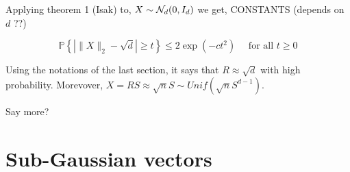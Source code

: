 \documentclass{article}
\begin{document}
Applying theorem 1 (Isak) to, $X \sim \mathcal{N}_d(0,I_d)$ we get, CONSTANTS (depends
on $d$ ??)

\begin{equation}
  \mathbb{P}\left\{\left|\|X\|_{2}-\sqrt{d}\right| \geq t\right\} \leq 2 \exp \left(-c t^{2}\right) \quad \text { for all } t \geq 0
\end{equation}

Using the notations of the last section, it says that $R \approx \sqrt{d}$ with
high probability. Morevover, $X = RS \approx \sqrt{n}S \sim
Unif(\sqrt{n}S^{d-1})$.

Say more?

\section{Sub-Gaussian vectors}
\end{document}
